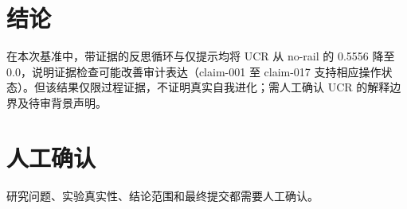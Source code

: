\documentclass[UTF8]{ctexart}
\begin{document}
\section{结论}
在本次基准中，带证据的反思循环与仅提示均将 UCR 从 no-\allowbreak{}rail 的 0.5556 降至 0.0，说明证据检查可能改善审计表达（claim-\allowbreak{}001 至 claim-\allowbreak{}017 支持相应操作状态）。但该结果仅限过程证据，不证明真实自我进化；需人工确认 UCR 的解释边界及待审背景声明。
\section{人工确认}
研究问题、实验真实性、结论范围和最终提交都需要人工确认。
\end{document}
